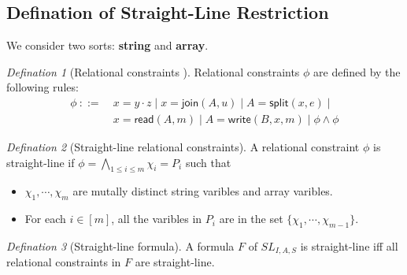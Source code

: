 \documentclass[12pt]{article}
\newcommand{\mysplit}{\mathsf{split}}
\newcommand{\myjoin}{\mathsf{join}}
\newcommand{\myread}{\mathsf{read}}
\newcommand{\mywrite}{\mathsf{write}}
\theoremstyle{remark}
\newtheorem{definition}{Defination}[section]
\begin{document}
\subsection{Defination of Straight-Line Restriction }
We consider two sorts: \textbf{string} and \textbf{array}.
\begin{definition}[Relational constraints ]
    Relational constraints $\phi$ are defined by the following rules:
    \begin{align*}
        \phi \ ::= \  & x=y\cdot z \mid x=\myjoin(A,u) \mid A = \mysplit(x,e) \mid        \\
                      & x=\myread(A, m) \mid A = \mywrite(B, x ,m) \mid \phi \wedge \phi 
    \end{align*}
\end{definition}
\begin{definition}[Straight-line relational constraints]
    A relational constraint $\phi$ is straight-line if $\phi = \bigwedge\limits_{1\leq i \leq m} \chi_i = P_i$ such that
    \begin{itemize}
        \item $\chi_1,\cdots,\chi_m $ are mutally distinct string varibles and array varibles.
        \item For each $i\in [m] $, all the varibles in $P_i$ are in the set $\{\chi_1,\cdots,\chi_{m-1} \}$.
    \end{itemize}
\end{definition}
\begin{definition}[Straight-line formula]
    A formula $F$ of $SL_{I,A,S}$ is straight-line iff all relational constraints in $F$ are straight-line.
\end{definition}

\end{document}
